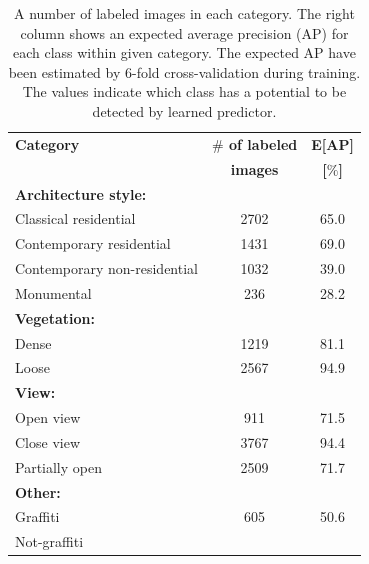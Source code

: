 \documentclass[runningheads, table]{llncs}
\begin{document}
  \begin{table}[t]
  \centering
    \begin{tabular}{|lcc|}
      \hline
      \rowcolor{maroon!70}
      \hspace{10mm} \textbf{Category}   &  \textbf{$\#$ of labeled} \hspace{3mm} & \hspace{3mm} \textbf{E[AP]} \hspace{2mm}    \\
      \rowcolor{maroon!70}
                      &     \hspace{0mm} \textbf{images}     & \hspace{3mm} \textbf{[$\%$]}     \\
      \hline
      \hline
      \rowcolor{maroon!40} \textbf{Architecture style:} & &\\
      \rowcolor{maroon!10}
        Classical residential           & 2702 & 65.0 \\
        \rowcolor{maroon!10}
        Contemporary residential        & 1431 & 69.0 \\
        \rowcolor{maroon!10}
        Contemporary non-residential    & 1032 & 39.0 \\
        \rowcolor{maroon!10}
        Monumental                      & 236  & 28.2 \\
      \hline
      \rowcolor{maroon!40} \textbf{Vegetation:}  & &\\
      \rowcolor{maroon!10}
        Dense               & 1219 & 81.1 \\
        \rowcolor{maroon!10}
        Loose               & 2567 & 94.9 \\
      \hline
      \rowcolor{maroon!40} \textbf{View:} & &\\
        \rowcolor{maroon!10}
        Open view           & 911  & 71.5 \\
        \rowcolor{maroon!10}
        Close view          & 3767 & 94.4 \\
        \rowcolor{maroon!10}
        Partially open      & 2509 & 71.7 \\
      \hline
      \rowcolor{maroon!40} \textbf{Other:} & &\\
      \rowcolor{maroon!10}
        Graffiti           & 605 & 50.6 \\
        \rowcolor{maroon!10}
        Not-graffiti        & & \\
      \hline
    \end{tabular}
    \vspace{3mm}
    \caption{
              A number of labeled images in each category. The right column shows an expected average precision (AP) for each class within given category. The expected AP have been estimated by 6-fold cross-validation during training. The values indicate which class has a potential to be detected by learned predictor.
            } 
    \label{tab:categories}
  \end{table}
\end{document}
